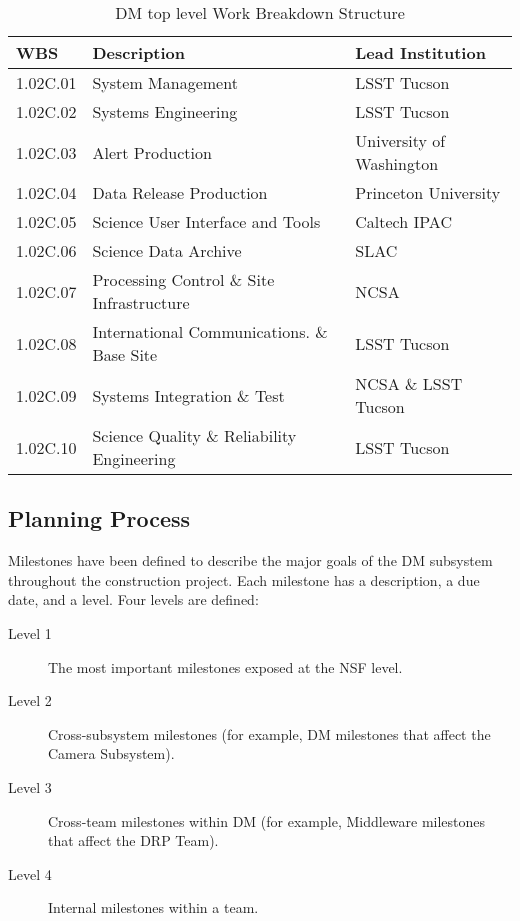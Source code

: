 \begin{table}
\caption{DM top level Work Breakdown Structure \label{tab:wbs}}
\begin{tabular}[htb]{|l|l|l|} \hline
\textbf{WBS}  &  \textbf{Description}   &  \textbf{Lead Institution}\\ \hline
1.02C.01& System Management                       &  LSST Tucson \\ \hline
1.02C.02& Systems Engineering                     &  LSST Tucson \\ \hline
1.02C.03& Alert Production                        &  University of Washington\\ \hline
1.02C.04& Data Release Production                 &  Princeton University\\ \hline
1.02C.05& Science User Interface and Tools        &  Caltech IPAC\\ \hline
1.02C.06& Science Data Archive                    &  SLAC\\ \hline
1.02C.07& Processing Control \& Site Infrastructure & NCSA\\ \hline
1.02C.08& International Communications. \& Base Site&  LSST Tucson \\ \hline
1.02C.09& Systems Integration \& Test               & NCSA \& LSST Tucson \\ \hline
1.02C.10& Science Quality \& Reliability Engineering& LSST Tucson \\ \hline
\end{tabular}
\end{table}

\subsection{Planning Process}\label{sect:plan}

Milestones have been defined to describe the major goals of the DM subsystem throughout the construction project.
Each milestone has a description, a due date, and a level.
Four levels are defined:

\begin{description}
\item[Level 1]{The most important milestones exposed at the NSF level.}
\item[Level 2]{Cross-subsystem milestones (for example, DM milestones that affect the Camera Subsystem).}
\item[Level 3]{Cross-team milestones within DM (for example, Middleware milestones that affect the DRP Team).}
\item[Level 4]{Internal milestones within a team.}
\end{description}

